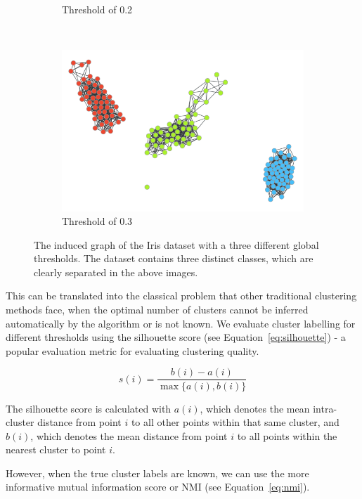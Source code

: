 \documentclass[conference]{IEEEtran}
\begin{document}
\begin{figure}[H]
\begin{subfigure}[c]{\columnwidth}
        \caption{Threshold of 0.2}
        \label{fig:iris_graph2}
    \end{subfigure}
    ~
    \begin{subfigure}[c]{\columnwidth}
        \includegraphics[width=\columnwidth]{images/iris_threshold_03.png}
        \caption{Threshold of 0.3}
        \label{fig:iris_graph3}
    \end{subfigure}
    \caption{The induced graph of the Iris dataset with a three different global thresholds. The dataset contains three distinct classes, which are clearly separated in the above images.}\label{fig:iris_graph}
\end{figure}

This can be translated into the classical problem that other traditional clustering methods face, when the optimal number of clusters cannot be inferred automatically by the algorithm or is not known. We evaluate cluster labelling for different thresholds using the silhouette score (see Equation~\ref{eq:silhouette}) - a popular evaluation metric for evaluating clustering quality.

\begin{equation}\label{eq:silhouette}
s(i) = \frac{{b(i) - a(i)}}{\max\{a(i),b(i)\}}
\end{equation}

The silhouette score is calculated with $a(i)$, which denotes the mean intra-cluster distance from point $i$ to all other points within that same cluster, and $b(i)$, which denotes the mean distance from point $i$ to all points within the nearest cluster to point $i$.

However, when the true cluster labels are known, we can use the more informative mutual information score or NMI (see Equation~\ref{eq:nmi}).
\end{document}
